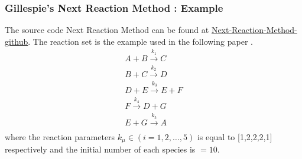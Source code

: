 \documentclass[11pt,a4paper]{article}
\begin{document}
\subsubsection{Gillespie's Next Reaction Method : Example}
The source code Next Reaction Method can be found at \href{https://github.com/Prateeba/TRAN-F501-Internship-201819/tree/master/Code/G_next_reaction}{Next-Reaction-Method-github}. The reaction set is the example used in the following paper \cite{gibson_efficient_2000}.
\begin{gather}
  {A + B \xrightarrow{k_{1}} C}      \\
  {B + C \xrightarrow{k_{2}} D}      \\
  {D + E \xrightarrow{k_{3}} E + F}     \\
  {F \xrightarrow{k_{4}} D + G}     \\
  {E + G \xrightarrow{k_{5}} A} \\
\end{gather}
where the reaction parameters $k_{\mu} \in (i = 1, 2, \dots, 5)$ is equal to [1,2,2,2,1] respectively and the initial number of each species is $= 10$.
\end{document}
